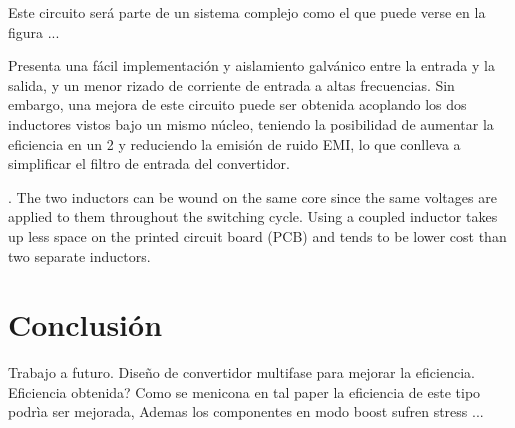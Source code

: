     Este circuito será parte de un sistema complejo como el que puede verse en la figura ... 
    
Presenta una fácil implementación y
aislamiento galvánico entre la entrada y la salida, y un menor rizado de corriente
de entrada a altas frecuencias. Sin embargo, una mejora de este circuito puede
ser obtenida acoplando los dos inductores vistos bajo un mismo núcleo, teniendo
la posibilidad de aumentar la eficiencia en un 2 y reduciendo la emisión de ruido
EMI, lo que conlleva a simplificar el filtro de entrada del convertidor.\cite{rios2017sistema}

.
The
two inductors can be wound on the same core since
the same voltages are applied to them throughout the
switching cycle. Using a coupled inductor takes up
less space on the printed circuit board (PCB) and
tends to be lower cost than two separate inductors.
 
\section{Conclusión}

Trabajo a futuro. Diseño de convertidor multifase para mejorar la eficiencia. 
Eficiencia obtenida? 
Como se menicona en tal paper la eficiencia de este tipo podrìa ser mejorada, Ademas los componentes en modo boost sufren stress ... 




\nocite{*}





